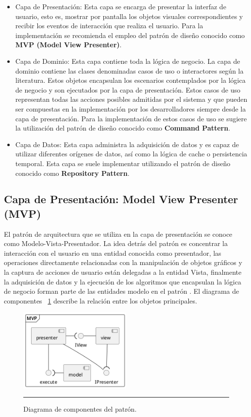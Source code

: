 \begin{itemize}
	\item Capa de Presentación: Esta capa se encarga de presentar la interfaz de usuario, esto es, mostrar por pantalla los objetos visuales correspondientes y recibir los eventos de interacción que realiza el usuario. Para la implementación se recomienda el empleo del patrón de diseño conocido como \textbf{MVP (Model View Presenter)}. 
	\item Capa de Dominio: Esta capa contiene toda la lógica de negocio. La capa de dominio contiene las clases denominadas casos de uso o interactores según la literatura. Estos objetos encapsulan los escenarios contemplados por la lógica de negocio y son ejecutados por la capa de presentación. Estos casos de uso representan todas las acciones posibles admitidas por el sistema y que pueden ser compuestas en la implementación por los desarrolladores siempre desde la capa de presentación. Para la implementación de estos casos de uso se sugiere la utilización del patrón de diseño conocido como \textbf{Command Pattern}.
	\item Capa de Datos: Esta capa administra la adquisición de datos y es capaz de utilizar diferentes orígenes de datos, así como la lógica de cache o persistencia temporal. Esta capa se suele implementar utilizando el patrón de diseño conocido como \textbf{Repository Pattern}.  
\end{itemize}
\subsection{Capa de Presentación: Model View Presenter (MVP)}
El patrón de arquitectura que se utiliza en la capa de presentación se conoce como Modelo-Vista-Presentador.
La idea detrás del patrón es concentrar la interacción con el usuario en una entidad conocida como presentador, las operaciones directamente relacionadas con la manipulación de objetos gráficos y la captura de acciones de usuario están delegadas a la entidad Vista, finalmente la adquisición de datos y la ejecución de los algoritmos que encapsulan la lógica de negocio forman parte de las entidades modelo en el patrón \cite{mvp_leiva}.
El diagrama de componentes ~\ref{fig:uml_mvp_component} describe la relación entre los objetos principales.


\begin{figure}[htbp]
	\centering
	\includegraphics[width=0.5\textwidth]{Figures/design/COMP_mvp.png}
	\rule{35em}{1pt}
	\caption[MVP Components]{Diagrama de componentes del patrón.}
	\label{fig:uml_mvp_component}
\end{figure}

